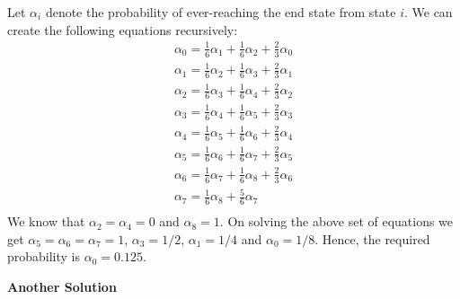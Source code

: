 \documentclass{article}
\begin{document}
\begin{enumerate}
	    \noindent %
		Let $\alpha_{i}$ denote the probability of ever-reaching the end state from state $i$. We can create the 
		following equations recursively:
		\begin{equation}
		\nonumber
		\begin{gathered}
			\alpha_{0} = \frac{1}{6} \alpha_{1} + \frac{1}{6} \alpha_{2} + \frac{2}{3} \alpha_{0} \\
			\alpha_{1} = \frac{1}{6} \alpha_{2} + \frac{1}{6} \alpha_{3} + \frac{2}{3} \alpha_{1} \\
			\alpha_{2} = \frac{1}{6} \alpha_{3} + \frac{1}{6} \alpha_{4} + \frac{2}{3} \alpha_{2} \\
			\alpha_{3} = \frac{1}{6} \alpha_{4} + \frac{1}{6} \alpha_{5} + \frac{2}{3} \alpha_{3} \\
			\alpha_{4} = \frac{1}{6} \alpha_{5} + \frac{1}{6} \alpha_{6} + \frac{2}{3} \alpha_{4} \\
			\alpha_{5} = \frac{1}{6} \alpha_{6} + \frac{1}{6} \alpha_{7} + \frac{2}{3} \alpha_{5} \\
			\alpha_{6} = \frac{1}{6} \alpha_{7} + \frac{1}{6} \alpha_{8} + \frac{2}{3} \alpha_{6} \\
			\alpha_{7} = \frac{1}{6} \alpha_{8} + \frac{5}{6} \alpha_{7} \\
		\end{gathered}
		\end{equation}
		We know that $\alpha_{2} = \alpha_{4} = 0$ and $\alpha_{8}=1$. On solving the above set of equations we get $\alpha_{5} = \alpha_{6} = \alpha_{7} = 1$, 
		$\alpha_{3} = 1/2$, $\alpha_{1} = 1/4$ and $\alpha_{0} = 1/8$. Hence, the required probability is $\alpha_{0} = 0.125$. \par
	
	    \noindent %
		\textbf{Another Solution} \par
	

\end{enumerate}
\end{document}
